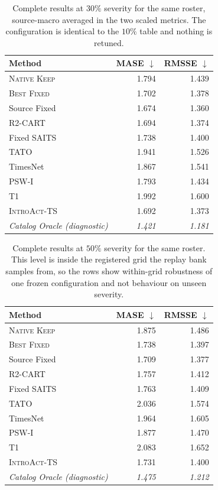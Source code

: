 \documentclass{article}
\newcommand{\oracle}[1]{\textit{\textcolor{phgray}{#1}}}
\newcommand{\introact}{\textsc{IntroAct-TS}}
\begin{document}
\begin{table}[htbp]
  \caption{Complete results at $30\%$ severity for the same roster, source-macro averaged in the two scaled metrics. The configuration is identical to the $10\%$ table and nothing is retuned.}
  \label{tab:app-sev30}
  \centering
  \small
  \setlength{\tabcolsep}{4pt}
\begin{tabular*}{\textwidth}{@{\extracolsep{\fill}}lrr@{}}
    \toprule
    Method & MASE $\downarrow$ & RMSSE $\downarrow$ \\
    \midrule
    \textsc{Native Keep} & 1.794 & 1.439 \\
    \textsc{Best Fixed} & 1.702 & 1.378 \\
    Source Fixed & 1.674 & 1.360 \\
    R2-CART & 1.694 & 1.374 \\
    Fixed SAITS & 1.738 & 1.400 \\
    TATO & 1.941 & 1.526 \\
    TimesNet & 1.867 & 1.541 \\
    PSW-I & 1.793 & 1.434 \\
    T1 & 1.992 & 1.600 \\
    \midrule
    \rowcolor{bestgray}\introact{} & 1.692 & 1.373 \\
    \midrule
    \oracle{Catalog Oracle (diagnostic)} & \oracle{1.421} & \oracle{1.181} \\
    \bottomrule
  \end{tabular*}
\end{table}

\begin{table}[htbp]
  \caption{Complete results at $50\%$ severity for the same roster. This level is inside the registered grid the replay bank samples from, so the rows show within-grid robustness of one frozen configuration and not behaviour on unseen severity.}
  \label{tab:app-sev50}
  \centering
  \small
  \setlength{\tabcolsep}{4pt}
\begin{tabular*}{\textwidth}{@{\extracolsep{\fill}}lrr@{}}
    \toprule
    Method & MASE $\downarrow$ & RMSSE $\downarrow$ \\
    \midrule
    \textsc{Native Keep} & 1.875 & 1.486 \\
    \textsc{Best Fixed} & 1.738 & 1.397 \\
    Source Fixed & 1.709 & 1.377 \\
    R2-CART & 1.757 & 1.412 \\
    Fixed SAITS & 1.763 & 1.409 \\
    TATO & 2.036 & 1.574 \\
    TimesNet & 1.964 & 1.605 \\
    PSW-I & 1.877 & 1.470 \\
    T1 & 2.083 & 1.652 \\
    \midrule
    \rowcolor{bestgray}\introact{} & 1.731 & 1.400 \\
    \midrule
    \oracle{Catalog Oracle (diagnostic)} & \oracle{1.475} & \oracle{1.212} \\
    \bottomrule
  \end{tabular*}
\end{table}
\end{document}
